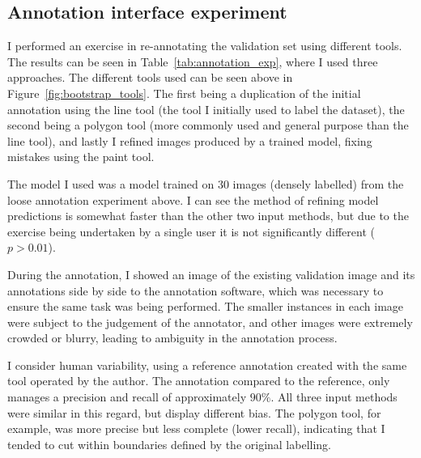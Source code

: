 \subsection {Annotation interface experiment}

I performed an exercise in re-annotating the validation set using different tools. The results can be seen in Table~\ref{tab:annotation_exp}, where I used three approaches. The different tools used can be seen above in Figure~\ref{fig:bootstrap_tools}.  The first being a duplication of the initial annotation using the line tool (the tool I initially used to label the dataset), the second being a polygon tool (more commonly used and general purpose than the line tool), and lastly I refined images produced by a trained model, fixing mistakes using the paint tool.

The model I used was a model trained on 30 images (densely labelled) from the loose annotation experiment above. I can see the method of refining model predictions is somewhat faster than the other two input methods, but due to the exercise being undertaken by a single user it is not significantly different ($ p > 0.01 $).

During the annotation, I showed an image of the existing validation image and its annotations side by side to the annotation software, which was necessary to ensure the same task was being performed. The smaller instances in each image were subject to the judgement of the annotator, and other images were extremely crowded or blurry, leading to ambiguity in the annotation process. 

I consider human variability, using a reference annotation created with the same tool operated by the author. The annotation compared to the reference, only manages a precision and recall of approximately $90\%$. All three input methods were similar in this regard, but display different bias. The polygon tool, for example, was more precise but less complete (lower recall), indicating that I tended to cut within boundaries defined by the original labelling. 
 
